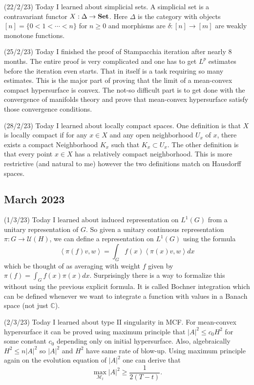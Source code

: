\documentclass[12pt,a4paper]{article}
\newcommand{\C}{\mathbb{C}}
\begin{document}
(22/2/23) Today I learned about simplicial sets. A simplicial set is a contravariant functor $ X : \Delta \to \textbf{\text{Set}}  $. Here $ \Delta $ is the category with objects $ [n] = \{0<1< \cdots <n\} $ for $ n \ge 0 $ and morphisms are $ \delta:[n] \to [m] $ are weakly monotone functions.

(25/2/23) Today I finished the proof of Stampacchia iteration after nearly 8 months. The entire proof is very complicated and one has to get $ L^{p} $ estimates before the iteration even starts. That in itself is a task requiring so many estimates. This is the major part of proving that the limit of a mean-convex compact hypersurface is convex. The not-so difficult part is to get done with the convergence of manifolds theory and prove that mean-convex hypersurface satisfy those convergence conditions.

(28/2/23) Today I learned about locally compact spaces. One definition is that $ X $ is locally compact if for any $ x \in X $ and any open neighborhood $ U_{x} $ of $ x $, there exists a compact Neighborhood $ K_{x} $ such that $ K_{x} \subset U_{x} $. The other definition is that every point $ x \in X $ has a relatively compact neighborhood. This is more restrictive (and natural to me) however the two definitions match on Hausdorff spaces.

\subsection*{March 2023}

\quad (1/3/23) Today I learned about induced representation on $ L^{1}(G) $ from a unitary representation of $ G $. So given a unitary continuous representation $ \pi : G \to \mathcal{U}(H) $, we can define a representation on $ L^{1}(G) $ using the formula 
\[ \left< \pi(f)v,w \right> = \int_{G}f(x)\left< \pi(x)v,w \right> dx\]
which be thought of as averaging with weight $ f $ given by $ \pi(f) = \int_{G}f(x)\pi(x) dx $. Surprisingly there is a way to formalize this without using the previous explicit formula. It is called Bochner integration which can be defined whenever we want to integrate a function with values in a Banach space (not just $ \C $).

(2/3/23) Today I learned about type II singularity in MCF. For mean-convex hypersurface it can be proved using maximum principle that $ |A|^{2} \le c_{0}H^{2} $ for some constant $ c_{0} $ depending only on initial hypersurface. Also, algebraically $ H^{2}\le n|A|^{2} $ so $ |A|^{2} $ and $ H^{2} $ have same rate of blow-up. Using maximum principle again on the evolution equation of $ |A|^{2} $ one can derive that 
\[ \max_{\mathcal{M}_{t}}|A|^{2}\ge \frac{1}{2(T-t)}. \]
\end{document}
